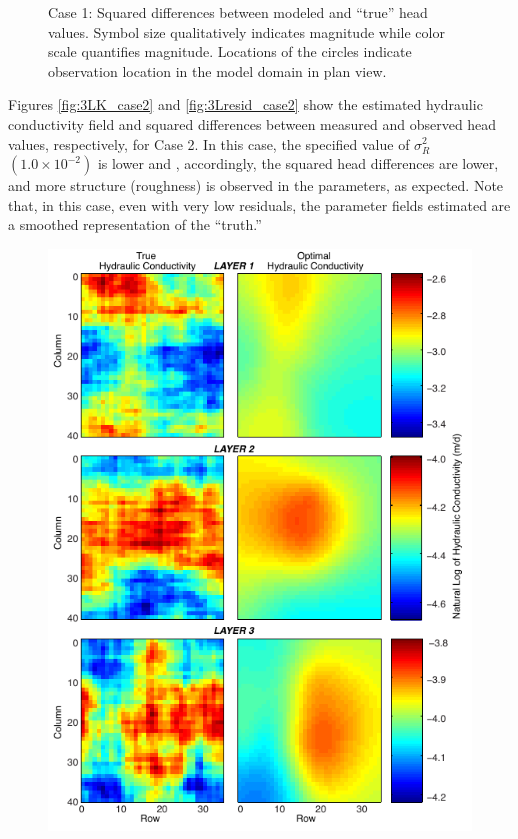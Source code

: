 \documentclass[11pt,oneside,onecolumn]{usgsreport}
\begin{document}
\begin{appendix}
\begin{figure}[!t]
\caption{\label{fig:3Lresid_case1}Case 1: Squared differences between modeled
and ``true'' head values. Symbol size qualitatively indicates magnitude
while color scale quantifies magnitude. Locations of the circles indicate
observation location in the model domain in plan view.}
\end{figure}


Figures \ref{fig:3LK_case2} and \ref{fig:3Lresid_case2} show the
estimated hydraulic conductivity field and squared differences between
measured and observed head values, respectively, for Case 2. In this
case, the specified value of $\sigma_{R}^{2}$ $\left(1.0\times10^{-2}\right)$
is lower and , accordingly, the squared head differences are lower,
and more structure (roughness) is observed in the parameters, as expected.
Note that, in this case, even with very low residuals, the parameter
fields estimated are a smoothed representation of the ``truth.'' 

\begin{figure}[!t]
\begin{center}\includegraphics{figures/3KL_case2}\end{center}


\end{figure}
\end{appendix}
\end{document}
